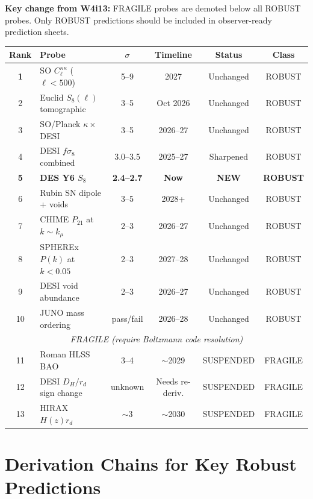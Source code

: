 \documentclass[11pt,a4paper]{article}
\newcommand{\kmu}{k_\mu}
\begin{document}
\textbf{Key change from W4i13:} FRAGILE probes are demoted below all
ROBUST probes. Only ROBUST predictions should be included in
observer-ready prediction sheets.

\begin{center}
\begin{tabular}{clcccc}
\toprule
\textbf{Rank} & \textbf{Probe} & \textbf{$\sigma$}
& \textbf{Timeline} & \textbf{Status} & \textbf{Class} \\
\midrule
\textbf{1} & SO $C_\ell^{\kappa\kappa}$ ($\ell < 500$) & 5--9
  & 2027 & Unchanged & ROBUST \\
2 & Euclid $S_8(\ell)$ tomographic & 3--5 & Oct 2026 & Unchanged
  & ROBUST \\
3 & SO/Planck $\kappa \times$ DESI & 3--5 & 2026--27 & Unchanged
  & ROBUST \\
4 & DESI $f\sigma_8$ combined & 3.0--3.5 & 2025--27 & Sharpened
  & ROBUST \\
\textbf{5} & \textbf{DES Y6 $S_8$} & \textbf{2.4--2.7}
  & \textbf{Now} & \textbf{NEW} & \textbf{ROBUST} \\
6 & Rubin SN dipole + voids & 3--5 & 2028+ & Unchanged & ROBUST \\
7 & CHIME $P_{21}$ at $k \sim \kmu$ & 2--3 & 2026--27 & Unchanged
  & ROBUST \\
8 & SPHEREx $P(k)$ at $k < 0.05$ & 2--3 & 2027--28 & Unchanged
  & ROBUST \\
9 & DESI void abundance & 2--3 & 2026--27 & Unchanged & ROBUST \\
10 & JUNO mass ordering & pass/fail & 2026--28 & Unchanged & ROBUST \\
\midrule
\multicolumn{6}{c}{\textit{FRAGILE (require Boltzmann code
  resolution)}} \\
\midrule
11 & Roman HLSS BAO & 3--4 & $\sim$2029 & SUSPENDED & FRAGILE \\
12 & DESI $D_H/r_d$ sign change & unknown & Needs re-deriv.
  & SUSPENDED & FRAGILE \\
13 & HIRAX $H(z)r_d$ & $\sim$3 & $\sim$2030 & SUSPENDED & FRAGILE \\
\bottomrule
\end{tabular}
\end{center}


\section{Derivation Chains for Key Robust Predictions}
\label{sec:derivations}
\end{document}
